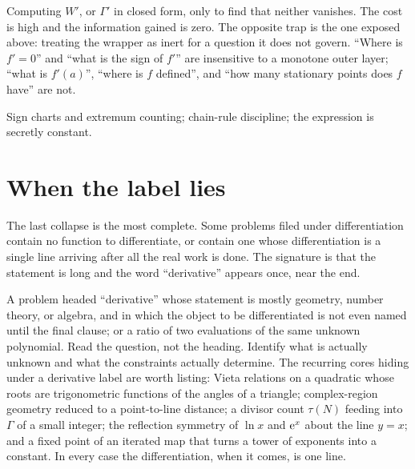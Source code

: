 \begin{trap}
Computing $W'$, or $\Gamma'$ in closed form, only to find that neither vanishes. The cost is high and the information gained is zero. The opposite trap is the one exposed above: treating the wrapper as inert for a question it does not govern. ``Where is $f'=0$'' and ``what is the sign of $f'$'' are insensitive to a monotone outer layer; ``what is $f'(a)$'', ``where is $f$ defined'', and ``how many stationary points does $f$ have'' are not.
\end{trap}

\begin{seealsob}Sign charts and extremum counting; chain-rule discipline; the expression is secretly constant.\end{seealsob}

\section{When the label lies}

The last collapse is the most complete. Some problems filed under differentiation contain no function to differentiate, or contain one whose differentiation is a single line arriving after all the real work is done. The signature is that the statement is long and the word ``derivative'' appears once, near the end.

\cue A problem headed ``derivative'' whose statement is mostly geometry, number theory, or algebra, and in which the object to be differentiated is not even named until the final clause; or a ratio of two evaluations of the same unknown polynomial.
\method Read the question, not the heading. Identify what is actually unknown and what the constraints actually determine. The recurring cores hiding under a derivative label are worth listing: Vieta relations on a quadratic whose roots are trigonometric functions of the angles of a triangle; complex-region geometry reduced to a point-to-line distance; a divisor count $\tau(N)$ feeding into $\Gamma$ of a small integer; the reflection symmetry of $\ln x$ and $\mathrm{e}^{x}$ about the line $y=x$; and a fixed point of an iterated map that turns a tower of exponents into a constant. In every case the differentiation, when it comes, is one line.

